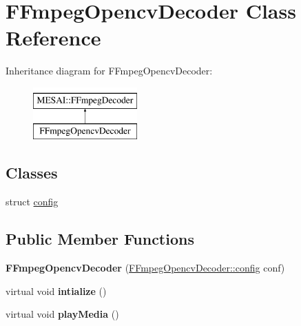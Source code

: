 \hypertarget{class_f_fmpeg_opencv_decoder}{}\section{F\+Fmpeg\+Opencv\+Decoder Class Reference}
\label{class_f_fmpeg_opencv_decoder}
Inheritance diagram for F\+Fmpeg\+Opencv\+Decoder\+:\begin{figure}[H]
\begin{center}
\leavevmode
\includegraphics[height=2.000000cm]{d4/da2/class_f_fmpeg_opencv_decoder}
\end{center}
\end{figure}
\subsection*{Classes}
\begin{DoxyCompactItemize}
\item 
struct \hyperlink{struct_f_fmpeg_opencv_decoder_1_1config}{config}
\end{DoxyCompactItemize}
\subsection*{Public Member Functions}
\begin{DoxyCompactItemize}
\item 
\mbox{\label{class_f_fmpeg_opencv_decoder_a420523542393ea9308a8eeec8b14ba71}} 
{\bfseries F\+Fmpeg\+Opencv\+Decoder} (\hyperlink{struct_f_fmpeg_opencv_decoder_1_1config}{F\+Fmpeg\+Opencv\+Decoder\+::config} conf)
\item 
\mbox{\label{class_f_fmpeg_opencv_decoder_aac56e6cba67cb1808d0acf390aa1facc}} 
virtual void {\bfseries intialize} ()
\item 
\mbox{\label{class_f_fmpeg_opencv_decoder_ab63e4419664779b1b213a972193aca10}} 
virtual void {\bfseries play\+Media} ()
\end{DoxyCompactItemize}
